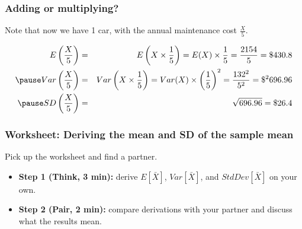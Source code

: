 \documentclass[slidestop,compress,mathserif]{beamer}
\begin{document}

\begin{frame}
\frametitle{Adding or multiplying?}


\pause

Note that now we have 1 car, with the annual maintenance cost $\frac{X}{5}$.

\pause 

{\small
\begin{eqnarray*} 
E\left(\frac{X}{5}\right) &=& E\left(X\times \frac{1}{5}\right) = E(X) \times \frac{1}{5} = \frac{2154}{5}  = \$ 430.8 \\
\pause
Var\left(\frac{X}{5}\right) &=& Var\left(X\times \frac{1}{5}\right) = Var(X) \times \left(\frac{1}{5}\right)^2 = \frac{132^2}{5^2} = \$^2 696.96 \\
\pause
SD\left(\frac{X}{5}\right) &=& \sqrt{696.96} =  \$ 26.4
\end{eqnarray*}
}

\end{frame}


\begin{frame}
\frametitle{Worksheet: Deriving the mean and SD of the sample mean}

Pick up the worksheet and find a partner.

\begin{itemize}
    \item \textbf{Step 1 (Think, 3 min):} derive $E[\bar{X}]$, $Var[\bar{X}]$, and $StdDev[\bar{X}]$ on your own.
    \item \textbf{Step 2 (Pair, 2 min):} compare derivations with your partner and discuss what the results mean.
\end{itemize}

\end{frame}
\end{document}
